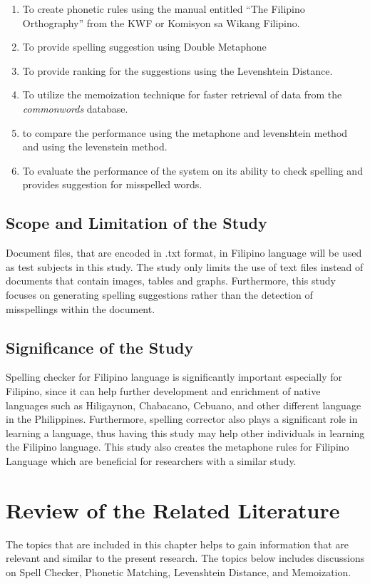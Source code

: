 \documentclass[12pt]{book}
\begin{document}
\begin{enumerate}
  \item	To create phonetic rules using the manual entitled “The Filipino Orthography” from the KWF or Komisyon sa Wikang Filipino.
  \item	To provide spelling suggestion using Double Metaphone
  \item	To provide ranking for the suggestions using the Levenshtein Distance.
  \item	To utilize the memoization technique for faster retrieval of data from the \textit{commonwords} database.
	\item to compare the performance using the metaphone and levenshtein method and using the levenstein method. 
	\item To evaluate the performance of the system on its ability to check spelling and provides suggestion for misspelled words.

\end{enumerate}

\section{Scope and Limitation of the Study}
Document files, that are encoded in .txt format, in Filipino language will be used as test subjects in this study. The study only limits the use of text files instead of documents that contain images, tables and graphs. Furthermore, this study focuses on generating spelling suggestions rather than the detection of misspellings within the document.

\section{Significance of the Study}Spelling checker for Filipino language is significantly important especially for Filipino, since it can help further development and enrichment of native languages such as Hiligaynon, Chabacano, Cebuano, and other different language in the Philippines. Furthermore, spelling corrector also plays a significant role in learning a language, thus having this study may help other individuals in learning the Filipino language. This study also creates the metaphone rules for Filipino Language which are beneficial for researchers with a similar study.

\let\cleardoublepage\clearpage
\chapter{Review of the Related Literature}
The topics that are included in this chapter helps to gain information that are relevant and similar to the present research. The topics below includes discussions on Spell Checker, Phonetic Matching, Levenshtein Distance, and Memoization.
\end{document}
